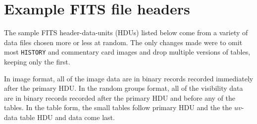 \documentclass[twoside]{article}
\begin{document}
\vfill\eject

\section{Example FITS file headers}
\label{Appen:examples}

The sample FITS header-data-units (HDUs) listed below come from a
variety of data files chosen more or less at random.  The only changes
made were to omit most {\tt HISTORY} and commentary card images and
drop multiple versions of tables, keeping only the first.

In image format, all of the image data are in binary records recorded
immediately after the primary HDU\@.  In the random groups format, all
of the visibility data are in binary records recorded after the
primary HDU and before any of the tables.  In the table form, the
small tables follow primary HDU and the the $uv$-data table HDU and
data come last.
\end{document}
